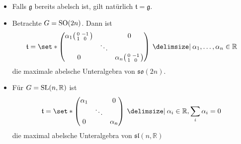 \begin{beispiel*}[{name=[maximal abelsche Unteralgebren]}]
	\begin{itemize}
		\item Falls $\mathfrak{g}$ bereits abelsch ist, gilt natürlich $\mathfrak{t} = \mathfrak{g}$.
		\item Betrachte $G=\operatorname{SO}(2n)$.
		Dann ist 
		\[
			\mathfrak{t} = \set*{\begin{pmatrix}
				\alpha_1\begin{psmallmatrix}
					0 & -1 \\ 1 & 0
				\end{psmallmatrix} & & 0 \\
				& \ddots &  \\
				0 & & \alpha_n \begin{psmallmatrix}
					0 & -1 \\ 1 & 0
				\end{psmallmatrix}
			\end{pmatrix} \given \alpha_1,\ldots ,\alpha_n \in \mathbb{R}}
		\]
		die maximale abelsche Unteralgebra von $\mathfrak{so}(2n)$.
		\item Für $G = \operatorname{SL}(n,\mathbb{R})$ ist
		\[
			\mathfrak{t} = \set*{\begin{pmatrix}
				\alpha_1 & & 0 \\
				& \ddots & \\
				0 & & \alpha_n
			\end{pmatrix} \given \alpha_i \in \mathbb{R}, \sum_i \alpha_i = 0}
		\]
		die maximal abelsche Unteralgebra von $\mathfrak{sl}(n,\mathbb{R})$
	\end{itemize}
\end{beispiel*}

